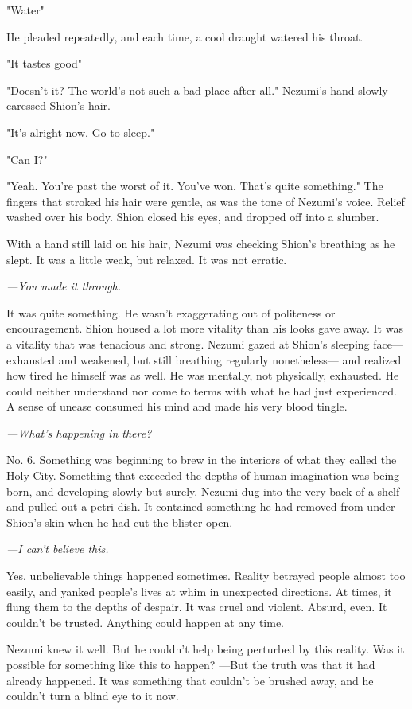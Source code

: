 "Water\el "

He pleaded repeatedly, and each time, a cool draught watered his throat.

"It tastes good\el "

"Doesn't it? The world's not such a bad place after all." Nezumi's hand
slowly caressed Shion's hair.

"It's alright now. Go to sleep."

"Can I\el ?"

"Yeah. You're past the worst of it. You've won. That's quite something."
The fingers that stroked his hair were gentle, as was the tone of
Nezumi's voice. Relief washed over his body. Shion closed his eyes, and
dropped off into a slumber.

\mybreak

With a hand still laid on his hair, Nezumi was checking Shion's
breathing as he slept. It was a little weak, but relaxed. It was not
erratic.

\emph{---You made it through.}

It was quite something. He wasn't exaggerating out of politeness or
encouragement. Shion housed a lot more vitality than his looks gave
away. It was a vitality that was tenacious and strong. Nezumi gazed at
Shion's sleeping face--- exhausted and weakened, but still breathing
regularly nonetheless--- and realized how tired he himself was as well. He
was mentally, not physically, exhausted. He could neither understand nor
come to terms with what he had just experienced. A sense of unease
consumed his mind and made his very blood tingle.

\emph{---What's happening in there?}

No. 6. Something was beginning to brew in the interiors of what they
called the Holy City. Something that exceeded the depths of human
imagination was being born, and developing slowly but surely. Nezumi dug
into the very back of a shelf and pulled out a petri dish. It contained
something he had removed from under Shion's skin when he had cut the
blister open.

\emph{---I can't believe this.}

Yes, unbelievable things happened sometimes. Reality betrayed people
almost too easily, and yanked people's lives at whim in unexpected
directions. At times, it flung them to the depths of despair. It was
cruel and violent. Absurd, even. It couldn't be trusted. Anything could
happen at any time.

Nezumi knew it well. But he couldn't help being perturbed by this
reality. Was it possible for something like this to happen? ---But the
truth was that it had already happened. It was something that couldn't
be brushed away, and he couldn't turn a blind eye to it now.

